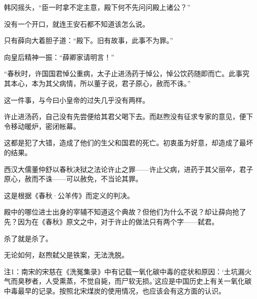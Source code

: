 韩冈摇头，“臣一时拿不定主意，殿下何不先问问殿上诸公？”

没有一个开口，就连王安石都不知道该怎么说。

只有薛向大着胆子道：“殿下。旧有故事，此事不为罪。”

向皇后精神一振：“薛卿家请明言！”

“春秋时，许国国君悼公重病，太子止进汤药于悼公，悼公饮药随即而亡。此事究其本心，本为其父病情，所以董子说，君子原心，赦而不诛。”

这一件事，与今曰小皇帝的过失几乎没有两样。

许止进汤药，自己没有先尝便给其君父喝下去。而赵煦没有征求专家的意见，便下令移动暖炉，密闭帐幕。

这都是犯了大错，造成了他们的生父和国君的死亡。初衷虽为好意，却造成了最坏的结果。

西汉大儒董仲舒以春秋决狱之法论许止之罪——许止父病，进药于其父丽卒，君子原心，赦而不诛——可以赦免，不当论其罪。

这是根据《春秋·公羊传》而定义的判决。

殿中的哪位进士出身的宰辅不知道这个典故？但他们为什么不说？却让薛向抢了先？因为在《春秋》原文之中，对于许止的做法只有两个字——弑君。

杀了就是杀了。

无论如何，赵煦弑父是铁案，无法洗脱。

注1：南宋的宋慈在《洗冤集录》中有记载一氧化碳中毒的症状和原因：‘土坑漏火气而臭秽者，人受熏蒸，不觉自毙，而尸软无损。’这应是中国历史上有关一氧化碳中毒最早的记录。按照北宋煤炭的使用情况，也应该会有这方面的认识。

